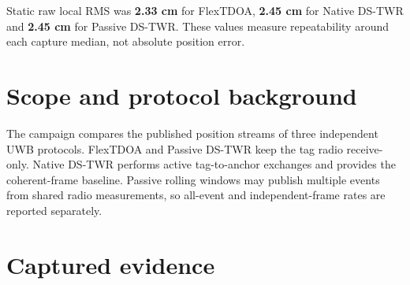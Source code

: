 \documentclass[10pt,a4paper]{article}
\begin{document}
Static raw local RMS was \textbf{2.33 cm} for FlexTDOA,
\textbf{2.45 cm} for Native DS-TWR and
\textbf{2.45 cm} for Passive DS-TWR. These values
measure repeatability around each capture median, not absolute position error.

\section{Scope and protocol background}
The campaign compares the published position streams of three independent UWB
protocols. FlexTDOA and Passive DS-TWR keep the tag radio receive-only. Native
DS-TWR performs active tag-to-anchor exchanges and provides the coherent-frame
baseline. Passive rolling windows may publish multiple events from shared radio
measurements, so all-event and independent-frame rates are reported separately.

\section{Captured evidence}
\begin{center}\scriptsize{}\end{center}
\end{document}
